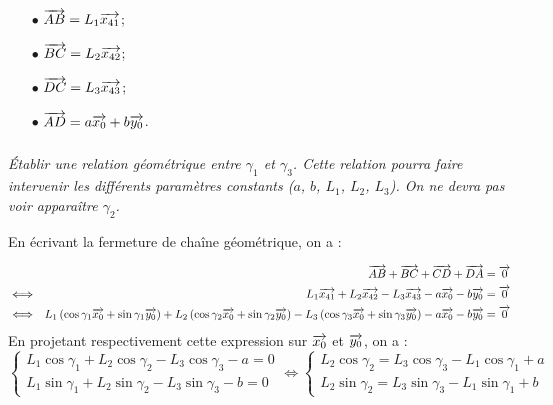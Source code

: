 \documentclass[10pt,fleqn]{article} %
\begin{document}
\begin{multicols}{2}
\begin{minipage}[c]{.45\linewidth}
\begin{itemize}
\item [$\bullet$] $\overrightarrow{AB}=L_1\overrightarrow{x_{41}}$;
\item [$\bullet$] $\overrightarrow{BC}=L_2\overrightarrow{x_{42}}$;
\end{itemize}
\end{minipage}\hfill
\begin{minipage}[c]{.45\linewidth}
\begin{itemize}
\item [$\bullet$] $\overrightarrow{DC}=L_3\overrightarrow{x_{43}}$;
\item [$\bullet$] $\overrightarrow{AD}=a\overrightarrow{x_{0}}+b\overrightarrow{y_{0}}$.
\end{itemize}
\end{minipage}

\fi
\subparagraph{}
\textit{Établir une relation géométrique entre $\gamma_1$ et $\gamma_3$. Cette relation pourra faire intervenir les différents paramètres constants ($a$, $b$, $L_1$, $L_2$, $L_3$). On ne devra pas voir apparaître $\gamma_2$.}

\ifprof
\begin{corrige}
En écrivant la fermeture de chaîne géométrique, on a : 

\begin{eqnarray*}
&& \overrightarrow{AB}+\overrightarrow{BC}+\overrightarrow{CD} + \overrightarrow{DA} = \overrightarrow{0} \\
& \Longleftrightarrow& L_1\overrightarrow{x_{41}} + L_2\overrightarrow{x_{42}} - L_3\overrightarrow{x_{43}}
- a\overrightarrow{x_{0}}-b\overrightarrow{y_{0}} = \overrightarrow{0}\\
& \Longleftrightarrow&  
L_1\left(\cos\gamma_{1}\overrightarrow{x_0}+ \sin\gamma_{1}\overrightarrow{y_0}\right) + L_2\left(\cos\gamma_{2}\overrightarrow{x_0}+ \sin\gamma_{2}\overrightarrow{y_0}\right)
-L_3\left(\cos\gamma_{3}\overrightarrow{x_0}+ \sin\gamma_{3}\overrightarrow{y_0}\right)
- a\overrightarrow{x_{0}}-b\overrightarrow{y_{0}} = \overrightarrow{0}\\
\end{eqnarray*}
En projetant respectivement cette expression sur $\overrightarrow{x_0}$ et $\overrightarrow{y_0}$, on a : 
$$
\left\{
\begin{array}{l}
L_1 \cos\gamma_{1} + L_2 \cos\gamma_{2} 
-L_3\cos\gamma_{3} - a= 0\\
L_1 \sin\gamma_{1} + L_2 \sin\gamma_{2}
-L_3 \sin\gamma_{3} -b=0
\end{array}
\right.
\Longleftrightarrow
\left\{
\begin{array}{l}
L_2 \cos\gamma_{2} =L_3\cos\gamma_{3}- L_1 \cos\gamma_{1} + a  \\
L_2 \sin\gamma_{2} = L_3 \sin\gamma_{3}-L_1 \sin\gamma_{1} + b
\end{array}
\right.
$$


\end{corrige}
\end{multicols}
\end{document}
